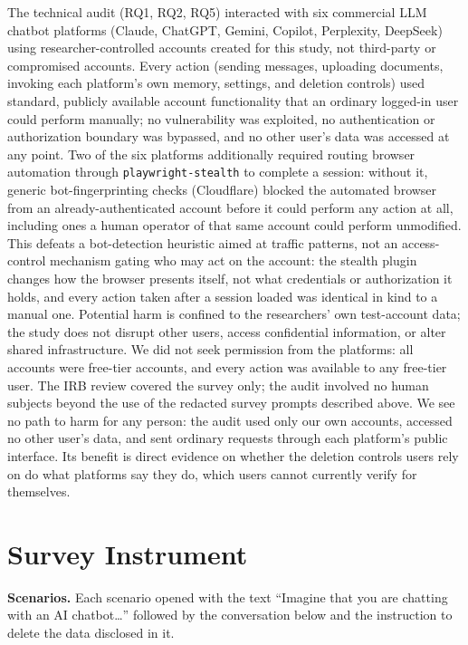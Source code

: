 \documentclass[conference,compsoc]{IEEEtran}
\begin{document}
The technical audit (RQ1, RQ2, RQ5) interacted with six commercial LLM
chatbot platforms (Claude, ChatGPT, Gemini, Copilot, Perplexity,
DeepSeek) using researcher-controlled accounts created for this study,
not third-party or compromised accounts. Every action (sending messages,
uploading documents, invoking each platform's own memory, settings, and
deletion controls) used standard, publicly available account
functionality that an ordinary logged-in user could perform manually; no
vulnerability was exploited, no authentication or authorization boundary
was bypassed, and no other user's data was accessed at any point.
Two of the six platforms additionally required routing browser automation
through \texttt{playwright-stealth} to complete a session: without it,
generic bot-fingerprinting checks (Cloudflare) blocked the automated
browser from an already-authenticated account before it could perform
any action at all, including ones a human operator of that same account
could perform unmodified. This defeats a bot-detection heuristic aimed at
traffic patterns, not an access-control mechanism gating who may act on
the account: the stealth plugin changes how the browser presents itself,
not what credentials or authorization it holds, and every action taken
after a session loaded was identical in kind to a manual one. Potential
harm is confined to the researchers' own test-account data; the study
does not disrupt other users, access confidential information, or alter
shared infrastructure. We did not seek permission from the platforms: all
accounts were free-tier accounts, and every action was available to any
free-tier user. The IRB review covered the survey only; the audit involved
no human subjects beyond the use of the redacted survey prompts described above.
We see no path to harm for any person: the audit used only our own accounts,
accessed no other user's data, and sent ordinary requests through each
platform's public interface. Its benefit is direct evidence on whether the
deletion controls users rely on do what platforms say they do, which users
cannot currently verify for themselves.

\appendix

\section{Survey Instrument}
\label{sec:instrument}

\textbf{Scenarios.} Each scenario opened with the text ``Imagine that you
are chatting with an AI chatbot\ldots'' followed by the conversation
below and the instruction to delete the data disclosed in it.
\end{document}
